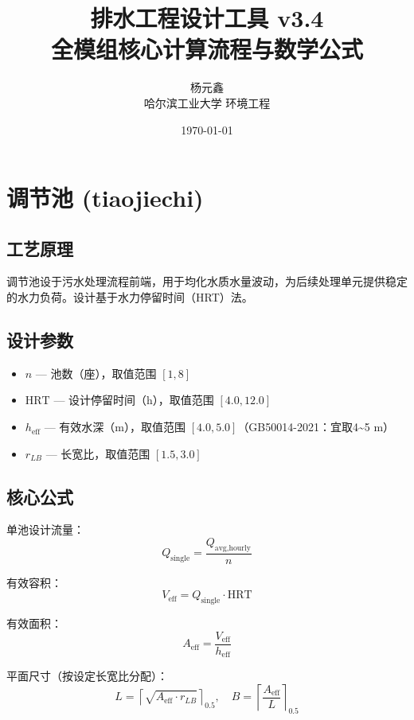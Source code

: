 \documentclass[12pt,a4paper]{ctexart}
\title{排水工程设计工具 v3.4\\全模组核心计算流程与数学公式}
\author{杨元鑫 \\ 哈尔滨工业大学 环境工程}
\date{\today}
\begin{document}
\maketitle
\tableofcontents
\newpage

\section{调节池 (tiaojiechi)}

\subsection{工艺原理}
调节池设于污水处理流程前端，用于均化水质水量波动，为后续处理单元提供稳定的水力负荷。设计基于水力停留时间（HRT）法。

\subsection{设计参数}
\begin{itemize}
  \item $n$ — 池数（座），取值范围 $[1, 8]$
  \item $\text{HRT}$ — 设计停留时间（h），取值范围 $[4.0, 12.0]$
  \item $h_{\text{eff}}$ — 有效水深（m），取值范围 $[4.0, 5.0]$（GB50014-2021：宜取4\textasciitilde5 m）
  \item $r_{LB}$ — 长宽比，取值范围 $[1.5, 3.0]$
\end{itemize}

\subsection{核心公式}
单池设计流量：
\begin{equation}
Q_{\text{single}} = \frac{Q_{\text{avg,hourly}}}{n}
\end{equation}

有效容积：
\begin{equation}
V_{\text{eff}} = Q_{\text{single}} \cdot \text{HRT}
\end{equation}

有效面积：
\begin{equation}
A_{\text{eff}} = \frac{V_{\text{eff}}}{h_{\text{eff}}}
\end{equation}

平面尺寸（按设定长宽比分配）：
\begin{equation}
L = \left\lceil \sqrt{A_{\text{eff}} \cdot r_{LB}} \right\rceil_{0.5}, \quad
B = \left\lceil \frac{A_{\text{eff}}}{L} \right\rceil_{0.5}
\end{equation}
\end{document}
